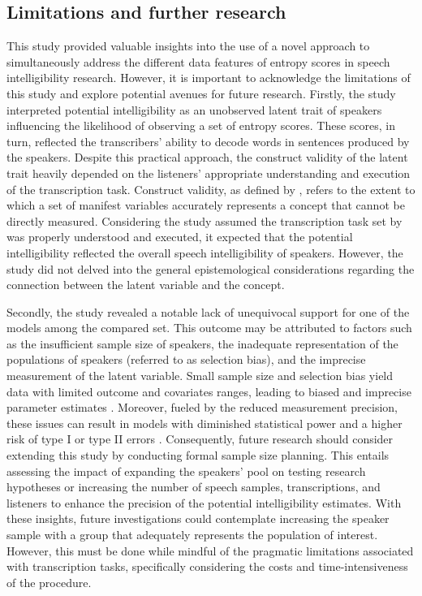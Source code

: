 \documentclass[
  authoryear,
  preprint,
  1p]{elsarticle}
\begin{document}
\subsection{Limitations and further research}\label{sec-D-LFR}

This study provided valuable insights into the use of a novel approach
to simultaneously address the different data features of entropy scores
in speech intelligibility research. However, it is important to
acknowledge the limitations of this study and explore potential avenues
for future research. Firstly, the study interpreted potential
intelligibility as an unobserved latent trait of speakers influencing
the likelihood of observing a set of entropy scores. These scores, in
turn, reflected the transcribers' ability to decode words in sentences
produced by the speakers. Despite this practical approach, the construct
validity of the latent trait heavily depended on the listeners'
appropriate understanding and execution of the transcription task.
Construct validity, as defined by \citet{Cronbach_et_al_1955}, refers to
the extent to which a set of manifest variables accurately represents a
concept that cannot be directly measured. Considering the study assumed
the transcription task set by \citet{Boonen_et_al_2023} was properly
understood and executed, it expected that the potential intelligibility
reflected the overall speech intelligibility of speakers. However, the
study did not delved into the general epistemological considerations
regarding the connection between the latent variable and the concept.

Secondly, the study revealed a notable lack of unequivocal support for
one of the models among the compared set. This outcome may be attributed
to factors such as the insufficient sample size of speakers, the
inadequate representation of the populations of speakers (referred to as
selection bias), and the imprecise measurement of the latent variable.
Small sample size and selection bias yield data with limited outcome and
covariates ranges, leading to biased and imprecise parameter estimates
\citep{Everitt_et_al_2010}. Moreover, fueled by the reduced measurement
precision, these issues can result in models with diminished statistical
power and a higher risk of type I or type II errors
\citep{McElreath_2020}. Consequently, future research should consider
extending this study by conducting formal sample size planning. This
entails assessing the impact of expanding the speakers' pool on testing
research hypotheses or increasing the number of speech samples,
transcriptions, and listeners to enhance the precision of the potential
intelligibility estimates. With these insights, future investigations
could contemplate increasing the speaker sample with a group that
adequately represents the population of interest. However, this must be
done while mindful of the pragmatic limitations associated with
transcription tasks, specifically considering the costs and
time-intensiveness of the procedure.
\end{document}

